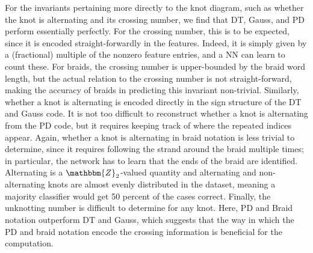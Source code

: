 \documentclass[11pt]{article}
\numberwithin{equation}{section}
\begin{document}
For the invariants pertaining more directly to the knot diagram, such as whether the knot is alternating and its crossing number, we find that DT, Gauss, and PD perform essentially perfectly. For the crossing number, this is to be expected, since it is encoded straight-forwardly in the features. Indeed, it is simply given by a (fractional) multiple of the nonzero feature entries, and a NN can learn to count these. For braids, the crossing number is upper-bounded by the braid word length, but the actual relation to the crossing number is not straight-forward, making the accuracy of braids in predicting this invariant non-trivial. Similarly, whether a knot is alternating is encoded directly in the sign structure of the DT and Gauss code. It is not too difficult to reconstruct whether a knot is alternating from the PD code, but it requires keeping track of where the repeated indices appear. Again, whether a knot is alternating in braid notation is less trivial to determine, since it requires following the strand around the braid multiple times; in particular, the network has to learn that the ends of the braid are identified. Alternating is a $\mathbbm{Z}_2$-valued quantity and alternating and non-alternating knots are almost evenly distributed in the dataset, meaning a majority classifier would get 50 percent of the cases correct. Finally, the unknotting number is difficult to determine for any knot. Here, PD and Braid notation outperform DT and Gauss, which suggests that the way in which the PD and braid notation encode the crossing information is beneficial for the computation. 
\end{document}
